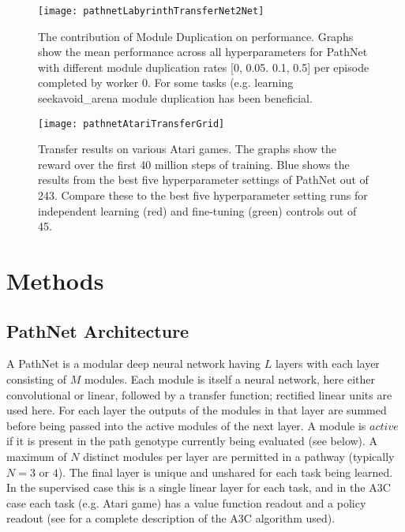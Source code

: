 \documentclass{sig-alternate-05-2015}
\begin{document}
\begin{figure*}[h!]
\centering
\texttt{[image: pathnetLabyrinthTransferNet2Net]}
\caption{The contribution of Module Duplication on performance. Graphs show the mean performance across all hyperparameters for PathNet with different module duplication rates [0, 0.05. 0.1, 0.5] per episode completed by worker 0. For some tasks (e.g. learning seekavoid\_arena module duplication has been beneficial.}
\label{fig:transferNet2Net}
\end{figure*}

\begin{figure*}[h!]
\centering
\texttt{[image: pathnetAtariTransferGrid]}
\caption{Transfer results on various Atari games. The graphs show the reward over the first 40 million steps of training. Blue shows the results from the best five hyperparameter settings of PathNet out of 243. Compare these to the best five hyperparameter setting runs for independent learning (red) and fine-tuning (green) controls out of 45.}
\label{fig:atariGrid}
\end{figure*}

\section{Methods} 

\subsection{PathNet Architecture} 
A PathNet is a modular deep neural network having \(L\) layers with each layer consisting of \(M\) modules. Each module is itself a neural network, here either convolutional or linear, followed by a transfer function; rectified linear units are used here. For each layer the outputs of the modules in that layer are summed before being passed into the active modules of the next layer. A module is \(active\) if it is present in the path genotype currently being evaluated (see below). A maximum of \(N\) distinct modules per layer are permitted in a pathway (typically \(N = 3\) or \(4\)). The final layer is unique and unshared for each task being learned. In the supervised case this is a single linear layer for each task, and in the A3C case each task (e.g. Atari game) has a value function readout and a  policy readout (see \cite{mnih2016asynchronous} for a complete description of the A3C algorithm used). \\
\end{document}
